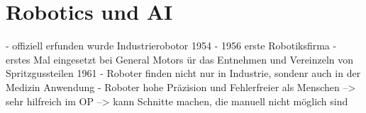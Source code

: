 \chapter{Robotics und AI}

- offiziell erfunden wurde Industrierobotor 1954 
- 1956 erste Robotiksfirma
- erstes Mal eingesetzt bei General Motors ür das Entnehmen und Vereinzeln von Spritzgussteilen 1961
- Roboter finden nicht nur in Industrie, sondenr auch in der Medizin Anwendung
- Roboter hohe Präzision und Fehlerfreier als Menschen --> sehr hilfreich im OP --> kann Schnitte machen, die manuell nicht möglich sind \cite{artikelRoboterOP}